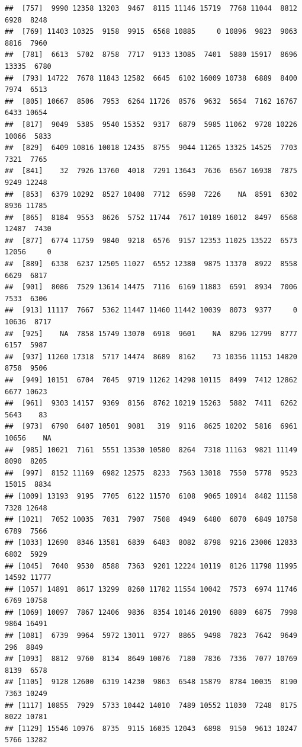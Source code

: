 \documentclass[
]{article}
\begin{document}
\begin{verbatim}
##  [757]  9990 12358 13203  9467  8115 11146 15719  7768 11044  8812  6928  8248
##  [769] 11403 10325  9158  9915  6568 10885     0 10896  9823  9063  8816  7960
##  [781]  6613  5702  8758  7717  9133 13085  7401  5880 15917  8696 13335  6780
##  [793] 14722  7678 11843 12582  6645  6102 16009 10738  6889  8400  7974  6513
##  [805] 10667  8506  7953  6264 11726  8576  9632  5654  7162 16767  6433 10654
##  [817]  9049  5385  9540 15352  9317  6879  5985 11062  9728 10226 10066  5833
##  [829]  6409 10816 10018 12435  8755  9044 11265 13325 14525  7703  7321  7765
##  [841]    32  7926 13760  4018  7291 13643  7636  6567 16938  7875  9249 12248
##  [853]  6379 10292  8527 10408  7712  6598  7226    NA  8591  6302  8936 11785
##  [865]  8184  9553  8626  5752 11744  7617 10189 16012  8497  6568 12487  7430
##  [877]  6774 11759  9840  9218  6576  9157 12353 11025 13522  6573 12056     0
##  [889]  6338  6237 12505 11027  6552 12380  9875 13370  8922  8558  6629  6817
##  [901]  8086  7529 13614 14475  7116  6169 11883  6591  8934  7006  7533  6306
##  [913] 11117  7667  5362 11447 11460 11442 10039  8073  9377     0 10636  8717
##  [925]    NA  7858 15749 13070  6918  9601    NA  8296 12799  8777  6157  5987
##  [937] 11260 17318  5717 14474  8689  8162    73 10356 11153 14820  8758  9506
##  [949] 10151  6704  7045  9719 11262 14298 10115  8499  7412 12862  6677 10623
##  [961]  9303 14157  9369  8156  8762 10219 15263  5882  7411  6262  5643    83
##  [973]  6790  6407 10501  9081   319  9116  8625 10202  5816  6961 10656    NA
##  [985] 10021  7161  5551 13530 10580  8264  7318 11163  9821 11149  8090  8205
##  [997]  8152 11169  6982 12575  8233  7563 13018  7550  5778  9523 15015  8834
## [1009] 13193  9195  7705  6122 11570  6108  9065 10914  8482 11158  7328 12648
## [1021]  7052 10035  7031  7907  7508  4949  6480  6070  6849 10758  6789  7566
## [1033] 12690  8346 13581  6839  6483  8082  8798  9216 23006 12833  6802  5929
## [1045]  7040  9530  8588  7363  9201 12224 10119  8126 11798 11995 14592 11777
## [1057] 14891  8617 13299  8260 11782 11554 10042  7573  6974 11746  6769 10758
## [1069] 10097  7867 12406  9836  8354 10146 20190  6889  6875  7998  9864 16491
## [1081]  6739  9964  5972 13011  9727  8865  9498  7823  7642  9649   296  8849
## [1093]  8812  9760  8134  8649 10076  7180  7836  7336  7077 10769  8139  6578
## [1105]  9128 12600  6319 14230  9863  6548 15879  8784 10035  8190  7363 10249
## [1117] 10855  7929  5733 10442 14010  7489 10552 11030  7248  8175  8022 10781
## [1129] 15546 10976  8735  9115 16035 12043  6898  9150  9613 10247  5766 13282

\end{verbatim}
\end{document}
